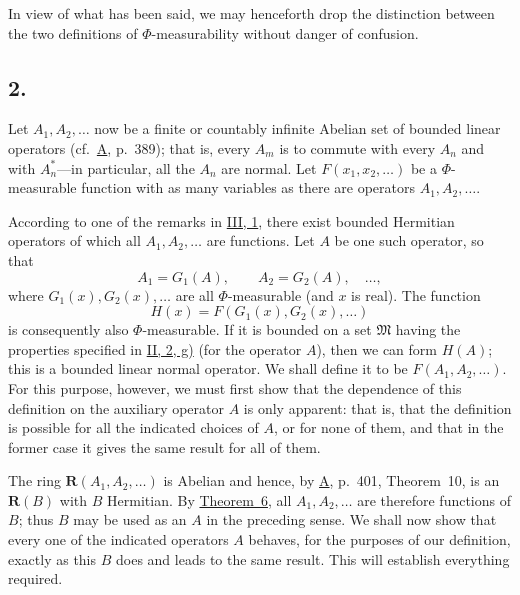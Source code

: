 \documentclass[12pt,b5paper,twoside]{article}
\begin{document}
In view of what has been said, we may henceforth drop the distinction between the two
definitions of $\Phi$-measurability without danger of confusion.

\subsection*{2.}
\label{sec:IV.2}
Let $A_1,A_2,\ldots$ now be a finite or countably infinite Abelian set of bounded
linear operators (cf.\ \hyperref[ref:A]{A}, p.~389); that is, every $A_m$ is to commute with every $A_n$
and with $A_n^*$---in particular, all the $A_n$ are normal.  Let
$F(x_1,x_2,\ldots)$ be a $\Phi$-measurable function with as many variables as there
are operators $A_1,A_2,\ldots$.

According to one of the remarks in \hyperref[sec:III.1]{III, 1}, there exist bounded
Hermitian operators of which all $A_1,A_2,\ldots$ are functions.  Let $A$ be one such
operator, so that
\[
 A_1=G_1(A),\qquad A_2=G_2(A),\quad\ldots,
\]
where $G_1(x),G_2(x),\ldots$ are all $\Phi$-measurable (and $x$ is real).  The
function
\[
 H(x)=F(G_1(x),G_2(x),\ldots)
\]
is consequently also $\Phi$-measurable.  If it is bounded on a set $\mathfrak{M}$
having the properties specified in \hyperref[sec:II.2]{II, 2, g)} (for the operator
$A$), then we can form $H(A)$; this is a bounded linear normal operator.  We shall
define it to be $F(A_1,A_2,\ldots)$.  For this purpose, however, we must first show
that the dependence of this definition on the auxiliary operator $A$ is only apparent:
that is, that the definition is possible for all the indicated choices of $A$, or
for none of them, and that in the former case it gives the same result for all of them.

The ring $\mathbf R(A_1,A_2,\ldots)$ is Abelian and hence, by \hyperref[ref:A]{A}, p.~401,
Theorem~10, is an $\mathbf R(B)$ with $B$ Hermitian.  By
\hyperref[thm:6]{Theorem~6}, all $A_1,A_2,\ldots$ are therefore functions of $B$;
thus $B$ may be used as an $A$ in the preceding sense.  We shall now show that every
one of the indicated operators $A$ behaves, for the purposes of our definition,
exactly as this $B$ does and leads to the same result.  This will establish everything
required.
\end{document}
